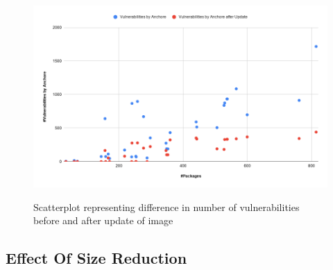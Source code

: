 \documentclass[a4paper,num-refs]{oup-contemporary}
\begin{document}
\begin{figure}[!htb]
        {\includegraphics[width=\columnwidth]
        {Figures/aferupdatewithpackage.png}}
        \caption{\label{fig:graph2} Scatterplot representing difference in number of vulnerabilities before and 
	after update of image}
      \end{figure}
\subsection{Effect Of Size Reduction}


\end{document}
